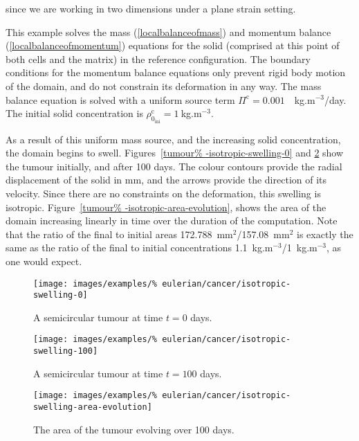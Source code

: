 \noindent since we are working in two dimensions under a plane strain
setting.

This example solves the mass (\ref{localbalanceofmass}) and momentum
balance (\ref{localbalanceofmomentum}) equations for the solid
(comprised at this point of both cells and the matrix) in the
reference configuration. The boundary conditions for the momentum
balance equations only prevent rigid body motion of the domain, and do
not constrain its deformation in any way. The mass balance equation is
solved with a uniform source term \mbox{$\Pi^{\mathrm{c}}=0.001$%
  ~kg.m$^{-3}$/day}. The initial solid concentration is
$\rho_{0_{\mathrm{ini}}}^{\mathrm{c}}=1~$kg.m$^{-3}$.

As a result of this uniform mass source, and the increasing solid
concentration, the domain begins to swell. Figures~\ref{tumour%
  -isotropic-swelling-0} and \ref{tumour-isotropic-swelling-100} show
the tumour initially, and after 100 days. The colour contours provide
the radial displacement of the solid in mm, and the arrows provide the
direction of its velocity. Since there are no constraints on the
deformation, this swelling is isotropic. Figure~\ref{tumour%
  -isotropic-area-evolution}, shows the area of the domain increasing
linearly in time over the duration of the computation. Note that the
ratio of the final to initial areas 172.788~mm$^2$/157.08~mm$^2$ is
exactly the same as the ratio of the final to initial concentrations
1.1~kg.m$^{-3}$/1~kg.m$^{-3}$, as one would expect.

\begin{figure}[!hptb]
\centering
\texttt{[image: images/examples/\%
eulerian/cancer/isotropic-swelling-0]}
\caption{A semicircular tumour at time $t=0$ days.}
\label{tumour-isotropic-swelling-0}
\end{figure}

\begin{figure}[!hptb]
\centering
\texttt{[image: images/examples/\%
eulerian/cancer/isotropic-swelling-100]}
\caption{A semicircular tumour at time $t=100$ days.}
\label{tumour-isotropic-swelling-100}
\end{figure}

\begin{figure}[!hptb]
\centering
\texttt{[image: images/examples/\%
eulerian/cancer/isotropic-swelling-area-evolution]}
\caption{The area of the tumour evolving over 100 days.}
\label{tumour-isotropic-area-evolution}
\end{figure}

